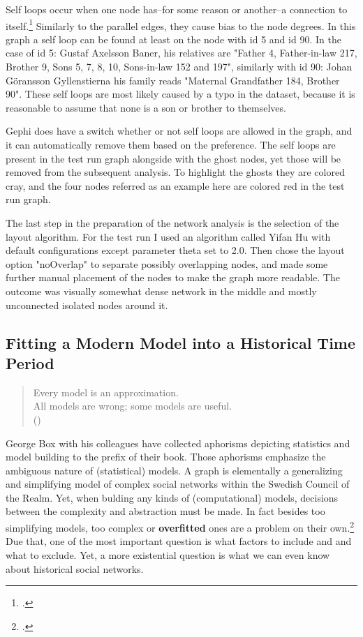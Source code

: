 Self loops occur when one node has–for some reason or another–a connection to itself.\footcite[p. 13.]{RajPM2018} Similarly to the parallel edges, they cause bias to the node degrees. In this graph a self loop can be found at least on the node with id 5 and id 90. In the case of id 5: Gustaf Axelsson Baner, his relatives are "Father 4, Father-in-law 217, Brother 9, Sons 5, 7, 8, 10, Sons-in-law 152 and 197", similarly with id 90: Johan Göransson Gyllenstierna his family reads "Maternal Grandfather 184, Brother 90". These self loops are most likely caused by a typo in the dataset, because it is reasonable to assume that none is a son or brother to themselves.
 
Gephi does have a switch whether or not self loops are allowed in the graph, and it can automatically remove them based on the preference. The self loops are present in the test run graph alongside with the ghost nodes, yet those will be removed from the subsequent analysis. To highlight the ghosts they are colored cray, and the four nodes referred as an example here are colored red in the test run graph.

The last step in the preparation of the network analysis is the selection of the layout algorithm. For the test run I used an algorithm called Yifan Hu with default configurations except parameter theta set to 2.0. Then chose the layout option "noOverlap" to separate possibly overlapping nodes, and made some further manual placement of the nodes to make the graph more readable. The outcome was visually somewhat dense network in the middle and mostly unconnected isolated nodes around it. 

\subsection{Fitting a Modern Model into a Historical Time Period}
\label{background}
\begin{quote}
	Every model is an approximation.\\
	All models are wrong; some models are useful.\\
	(\cite[prefix]{statisticsfor})
\end{quote}

George Box with his colleagues have collected aphorisms depicting statistics and model building to the prefix of their book. Those aphorisms emphasize the ambiguous nature of (statistical) models. A graph is elementally a generalizing and simplifying model of complex social networks within the Swedish Council of the Realm. Yet, when bulding any kinds of (computational) models, decisions between the complexity and abstraction must be made. In fact besides too simplifying models, too complex or \textbf{overfitted} ones are a problem on their own.\footcite["overfitting: a model with no constraints can be fit arbitrarily close to data, yielding a low prediction error on observed data but noisy inferences
and poor performance on new cases" p. 464.]{gellmanEtAl2021} Due that, one of the most important question is what factors to include and and what to exclude. Yet, a more existential question is what we can even know about historical social networks. 

